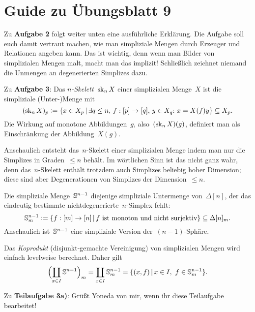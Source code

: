 \documentclass{uebblatt}
\begin{document}
\section*{Guide zu Übungsblatt 9}

Zu \textbf{Aufgabe 2} folgt weiter unten eine ausführliche Erklärung. Die
Aufgabe soll euch damit vertraut machen, wie man simpliziale Mengen durch
Erzeuger und Relationen angeben kann. Das ist wichtig, denn wenn man Bilder von
simplizialen Mengen malt, macht man das implizit! Schließlich zeichnet niemand
die Unmengen an degenerierten Simplizes dazu.

Zu \textbf{Aufgabe 3}: Das \emph{$n$-Skelett}~$\operatorname{sk}_n X$ einer simplizialen
Menge~$X$ ist die simpliziale (Unter-)Menge mit
\[ (\sk_n X)_p \defeq \{ x \in X_p \,|\,
  \exists q \leq n,\, f : [p] \to [q],\, y \in X_q{:}\ 
  x = X(f)y \} \subseteq X_p. \]
Die Wirkung auf monotone Abbildungen~$g$, also~$(\operatorname{sk}_n X)(g)$, definiert man als
Einschränkung der Abbildung~$X(g)$.

Anschaulich entsteht das~$n$-Skelett einer simplizialen Menge indem man nur die
Simplizes in Graden~$\leq n$ behält. Im wörtlichen Sinn ist das nicht ganz
wahr, denn das~$n$-Skelett enthält trotzdem auch Simplizes beliebig hoher
Dimension; diese sind aber Degenerationen von Simplizes der Dimension~$\leq n$.

Die simpliziale Menge~$\mathbb{S}^{n-1}$ diejenige simpliziale Untermenge
von~$\Delta[n]$, der das eindeutig bestimmte nichtdegenerierte~$n$-Simplex
fehlt:
\[ \mathbb{S}^{n-1}_m \vcentcolon= \{ f : [m] \to [n] \,|\,
  \text{$f$ ist monoton und nicht surjektiv} \} \subseteq \Delta[n]_m. \]
Anschaulich ist~$\mathbb{S}^{n-1}$ eine simpliziale Version der~$(n-1)$-Sphäre.

Das \emph{Koprodukt} (disjunkt-gemachte Vereinigung) von simplizialen Mengen
wird einfach levelweise berechnet. Daher gilt
\[ \Bigl(\coprod_{x \in I} \mathbb{S}^{n-1}\Bigr)_m =
  \coprod_{x \in I} \mathbb{S}^{n-1}_m =
  \{ (x, f) \,|\, x \in I,\ f \in \mathbb{S}^{n-1}_m \}. \]

Zu \textbf{Teilaufgabe 3a)}: Grüßt Yoneda von mir, wenn ihr diese Teilaufgabe
bearbeitet!
\end{document}
